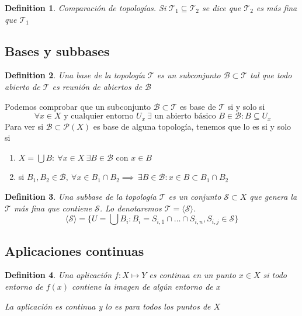 \documentclass{myclass}
\newtheorem*{definition}{Definition}
\begin{document}
\begin{definition}
Comparación de topologías. Si $\mathcal{T}_1\subseteq \mathcal{T}_2$ se dice que $\mathcal{T}_2$ es más fina que $\mathcal{T}_1$
\end{definition}

\subsection{Bases y subbases}
\begin{definition}
Una base de la topología $\mathcal{T}$ es un subconjunto $\mathcal{B}\subset \mathcal{T}$ tal que todo abierto de $\mathcal{T}$ es reunión de abiertos de $\mathcal{B}$ 
\end{definition}
Podemos comprobar que un subconjunto $\mathcal{B}\subset \mathcal{T}$ es base de $\mathcal{T}$ si y solo si
 \[
\ \forall x \in X \text{ y cualquier entorno } U_x \ \exists \text{ un abierto básico } B\in \mathcal{B}: B\subseteq U_x
\] 
Para ver si $\mathcal{B}\subset \mathcal{P}(X)$ es base de alguna topología, tenemos que lo es si y solo si
\begin{enumerate}[topsep=-6pt, itemsep=0pt]
  \item $X=\bigcup B: \ \forall x \in X \ \exists B \in \mathcal{B}$ con $x \in B$ 
  \item si $B_1, B_2 \in \mathcal{B}, \ \forall x \in B_1 \cap B_2 \implies \ \exists B\in \mathcal{B}: x\in B\subset B_1\cap B_2$
\end{enumerate}

\begin{definition}
Una subbase de la topología $\mathcal{T}$ es un conjunto $\mathcal{S}\subset X$ que genera la $\mathcal{T}$ más fina que contiene $\mathcal{S}$. Lo denotaremos $\mathcal{T} = \langle \mathcal{S} \rangle $.
\[
\langle \mathcal{S} \rangle  = \{U=\bigcup B_i: B_i  = S_{i, 1}\cap \ldots \cap S_{i, n}, S_{i, j}\in  \mathcal{S}\}
\] 
\end{definition}

\subsection{Aplicaciones continuas}
\begin{definition}
Una aplicación $f : X\mapsto Y$ es continua en un punto $x\in X$ si todo entorno de $f(x)$ contiene la imagen de algún entorno de  $x$

La aplicación es continua y lo es para todos los puntos de  $X$
\end{definition}
\end{document}
